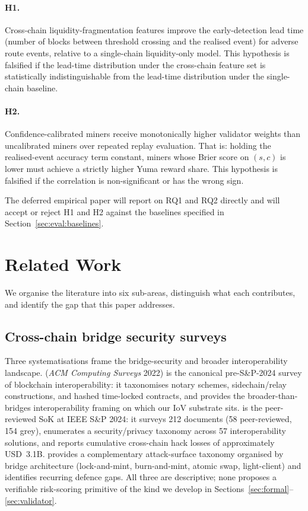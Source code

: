 \documentclass[11pt,a4paper]{article}
\begin{document}
\paragraph{H1.} Cross-chain liquidity-fragmentation features improve the early-detection
lead time (number of blocks between threshold crossing and the realised event) for
adverse route events, relative to a single-chain liquidity-only model. This hypothesis is
falsified if the lead-time distribution under the cross-chain feature set is statistically
indistinguishable from the lead-time distribution under the single-chain baseline.

\paragraph{H2.} Confidence-calibrated miners receive monotonically higher validator
weights than uncalibrated miners over repeated replay evaluation. That is: holding the
realised-event accuracy term constant, miners whose Brier score on $(s, c)$ is lower
must achieve a strictly higher Yuma reward share. This hypothesis is falsified if the
correlation is non-significant or has the wrong sign.

The deferred empirical paper will report on RQ1 and RQ2 directly and will accept or reject
H1 and H2 against the baselines specified in Section~\ref{sec:eval:baselines}.

\section{Related Work}\label{sec:related}

We organise the literature into six sub-areas, distinguish what each contributes, and
identify the gap that this paper addresses.

\subsection{Cross-chain bridge security surveys}\label{sec:related:bridge-sok}

Three systematisations frame the bridge-security and broader interoperability
landscape. \cite{belchior2021survey} (\emph{ACM Computing Surveys} 2022) is the
canonical pre-S\&P-2024 survey of blockchain interoperability: it taxonomises
notary schemes, sidechain/relay constructions, and hashed time-locked contracts,
and provides the broader-than-bridges interoperability framing on which our IoV
substrate sits. \cite{augusto2024sok} is the peer-reviewed SoK at IEEE S\&P 2024:
it surveys 212 documents (58 peer-reviewed, 154 grey), enumerates a
security/privacy taxonomy across 57 interoperability solutions, and reports
cumulative cross-chain hack losses of approximately USD~3.1B. \cite{zhang2023sok}
provides a complementary attack-surface taxonomy organised by bridge architecture
(lock-and-mint, burn-and-mint, atomic swap, light-client) and identifies recurring
defence gaps. All three are descriptive; none proposes a verifiable risk-scoring
primitive of the kind we develop in Sections~\ref{sec:formal}--\ref{sec:validator}.
\end{document}
